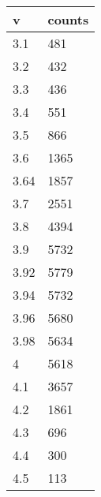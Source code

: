 \begin{table}[H]
    \centering
    \begin{tabular}{|l|l|}
    \hline
        v & counts \\ \hline
        3.1 & 481 \\ \hline
        3.2 & 432 \\ \hline
        3.3 & 436 \\ \hline
        3.4 & 551 \\ \hline
        3.5 & 866 \\ \hline
        3.6 & 1365 \\ \hline
        3.64 & 1857 \\ \hline
        3.7 & 2551 \\ \hline
        3.8 & 4394 \\ \hline
        3.9 & 5732 \\ \hline
        3.92 & 5779 \\ \hline
        3.94 & 5732 \\ \hline
        3.96 & 5680 \\ \hline
        3.98 & 5634 \\ \hline
        4 & 5618 \\ \hline
        4.1 & 3657 \\ \hline
        4.2 & 1861 \\ \hline
        4.3 & 696 \\ \hline
        4.4 & 300 \\ \hline
        4.5 & 113 \\ \hline
    \end{tabular}
\end{table}